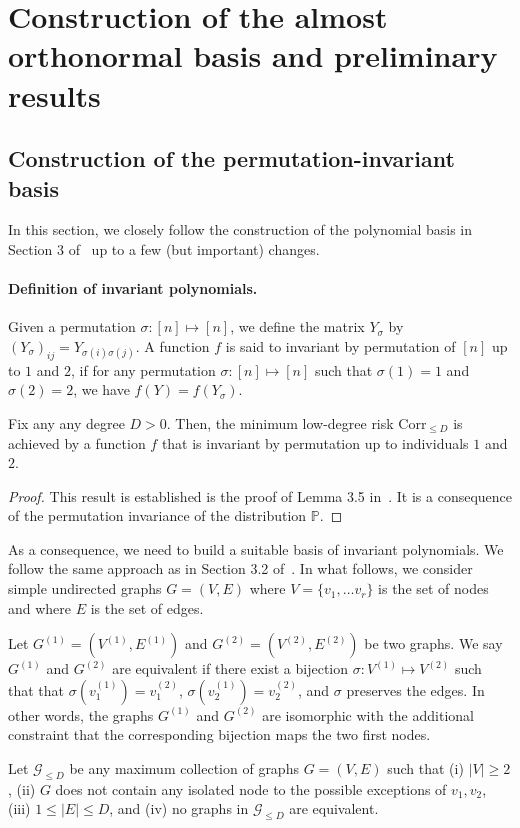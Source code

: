 \documentclass[final]{colt2026}
\newcommand{\1}{\mathbf{1}}
\begin{document}
\section{Construction of the almost orthonormal basis and preliminary results}\label{sec:basis}

\subsection{Construction of the permutation-invariant basis}

In this section, we closely follow the construction of the polynomial basis in Section 3 of~\cite{CGGV25} up to a few (but important) changes. 


\paragraph{Definition of invariant polynomials.} 


Given a permutation $\sigma: [n]\mapsto [n]$, we define the matrix $Y_{\sigma}$ by $(Y_{\sigma})_{ij}= Y_{\sigma(i)\sigma(j)}$. A function $f$ is said to invariant by permutation of $[n]$ up to $1$ and $2$, if for any permutation $\sigma:[n]\mapsto [n]$ such that $\sigma(1)=1$ and $\sigma(2)=2$, we have $f(Y)= f(Y_{\sigma})$. 

\begin{lemma}\label{lem:reduction:permutation}
Fix any any degree $D>0$. Then, the minimum low-degree risk  $\mathrm{Corr}_{\leq D}$ is achieved by a function $f$ that is invariant by permutation up to individuals $1$ and $2$.
\end{lemma}

\begin{proof}
This result is established is the proof of Lemma 3.5 in~\cite{CGGV25}. It is a consequence of the permutation invariance of the distribution $\mathbb{P}$. 
\end{proof}


As a consequence, we need to build a suitable basis of invariant polynomials. We follow the same approach as in Section 3.2 of~\cite{CGGV25}.
 In what follows, we consider simple undirected graphs $G= (V,E)$ where $V=\{v_1,\ldots v_{r}\}$ is the set of nodes and where $E$ is the set of edges.%


Let $G^{(1)}=(V^{(1)},E^{(1)})$ and $G^{(2)}= (V^{(2)},E^{(2)})$ be two graphs. We say $G^{(1)}$ and $G^{(2)}$ are equivalent if there exist a bijection $\sigma: V^{(1)} \mapsto V^{(2)}$ such that that $\sigma(v^{(1)}_1)= v_1^{(2)}$, $\sigma(v^{(1)}_2)= v_2^{(2)}$, and $\sigma$ preserves the edges. In other words, the graphs $G^{(1)}$ and $G^{(2)}$ are isomorphic with the additional constraint that the corresponding bijection maps the two first nodes.  
\begin{definition}
Let $\mathcal{G}_{\leq D}$ be any maximum collection of graphs $G=(V,E)$ such that (i) $|V|\geq 2$, (ii) $G$ does not contain any isolated node to the possible exceptions of $v_1,v_2$,  (iii) $1\leq |E|\leq D$, and (iv) no graphs in $\mathcal{G}_{\leq D}$ are equivalent.
\end{definition}
\end{document}
